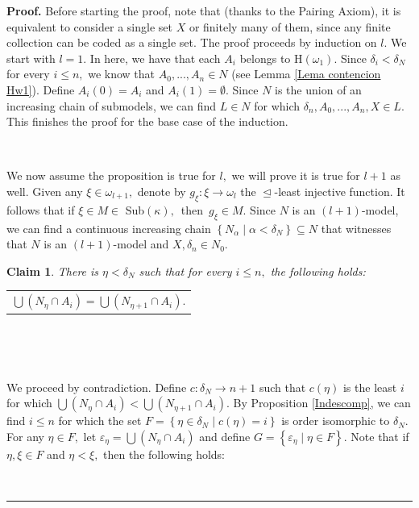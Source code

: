 \documentclass{article}%
\newtheorem{claim}[theorem]{Claim}
\newenvironment{proof}[1][Proof]{\noindent\textbf{#1.} }{\ \rule{0.5em}{0.5em}}
\begin{document}
\begin{proof}
Before starting the proof, note that (thanks to the Pairing Axiom), it is
equivalent to consider a single set $X$ or finitely many of them, since any
finite collection can be coded as a single set. The proof proceeds by
induction on $l.$ We start with $l=1.$ In here, we have that each $A_{i}$
belongs to \textsf{H}$\left(  \omega_{1}\right)  .$ Since $\delta_{i}%
<\delta_{N}$ for every $i\leq n,$ we know that $A_{0},...,A_{n}\in N$ (see
Lemma \ref{Lema contencion Hw1}). Define $A_{i}\left(  0\right)  =A_{i}$ and
$A_{i}\left(  1\right)  =\emptyset$. Since $N$ is the union of an increasing
chain of submodels, we can find $L\in N$ for which $\delta_{n},A_{0}%
,...,A_{n},X\in L.$ This finishes the proof for the base case of the induction.

\qquad\qquad\qquad\ \ \ \ 

We now assume the proposition is true for $l,$ we will prove it is true for
$l+1$ as well. Given any $\xi\in\omega_{l+1},$ denote by $g_{\xi}%
:\xi\longrightarrow\omega_{l}$ the $\trianglelefteq$-least injective function.
It follows that if $\xi\in M\in$ \textsf{Sub}$\left(  \kappa\right)
,$\ then\ $g_{\xi}\in M$. Since $N$ is an $\left(  l+1\right)  $-model, we can
find a continuous increasing chain $\left\{  N_{\alpha}\mid\alpha<\delta
_{N}\right\}  \subseteq N$ that witnesses that $N$ is an $\left(  l+1\right)
$-model and $X,\delta_{n}\in N_{0}.$

\begin{claim}
There is $\eta<\delta_{N}$ such that for every $i\leq n,$ the following
holds:\medskip

\hfill%
\begin{tabular}
[c]{l}%
$%
{\displaystyle\bigcup}
\left(  N_{\eta}\cap A_{i}\right)  =%
{\displaystyle\bigcup}
\left(  N_{\eta+1}\cap A_{i}\right)  .$%
\end{tabular}
\qquad\qquad\ \qquad\qquad\qquad\hfill
\end{claim}

\qquad\ \ \ \qquad\ \ \ 

We proceed by contradiction. Define $c:\delta_{N}\longrightarrow n+1$ such
that $c\left(  \eta\right)  $ is the least $i$ for which $%
{\displaystyle\bigcup}
\left(  N_{\eta}\cap A_{i}\right)  <%
{\displaystyle\bigcup}
\left(  N_{\eta+1}\cap A_{i}\right)  .$ By Proposition \ref{Indescomp}, we can
find $i\leq n$ for which the set $F=\left\{  \eta\in\delta_{N}\mid c\left(
\eta\right)  =i\right\}  $ is order isomorphic to $\delta_{N}.$ For any
$\eta\in F,$ let $\varepsilon_{\eta}=%
{\displaystyle\bigcup}
\left(  N_{\eta}\cap A_{i}\right)  $ and define $G=\left\{  \varepsilon_{\eta
}\mid\eta\in F\right\}  .$ Note that if $\eta,\xi\in F$ and $\eta<\xi,$ then
the following holds:\medskip


\end{proof}
\end{document}
